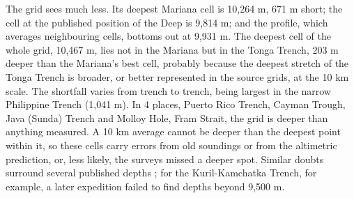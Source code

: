 \documentclass[11pt,a4paper]{article}
\begin{document}
The grid sees much less. Its deepest Mariana cell is 10,264 m, 671 m short; the cell at the published position of the Deep is 9,814 m; and the profile, which averages neighbouring cells, bottoms out at 9,931 m. The deepest cell of the whole grid, 10,467 m, lies not in the Mariana but in the Tonga Trench, 203 m deeper than the Mariana's best cell, probably because the deepest stretch of the Tonga Trench is broader, or better represented in the source grids, at the 10 km scale. The shortfall varies from trench to trench, being largest in the narrow Philippine Trench (1,041 m). In 4 places, Puerto Rico Trench, Cayman Trough, Java (Sunda) Trench and Molloy Hole, Fram Strait, the grid is deeper than anything measured. A 10 km average cannot be deeper than the deepest point within it, so these cells carry errors from old soundings or from the altimetric prediction, or, less likely, the surveys missed a deeper spot. Similar doubts surround several published depths \citep{stewart}; for the Kuril-Kamchatka Trench, for example, a later expedition failed to find depths beyond 9,500 m.
\end{document}
